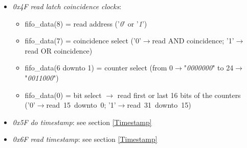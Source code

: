 \begin{itemize}
\begin{itemize}
	\end{itemize}
	\item \textit{0x4F} \textit{read latch coincidence clocks}:
	\begin{itemize}
		\item fifo\_data(8) = read address ('\textit{0}' or '\textit{1}')
		\item fifo\_data(7) = coincidence select ('0'$\rightarrow$read AND coincidence; '1'$\rightarrow$read OR coincidence)
		\item fifo\_data(6 downto 1) = counter select (from 0$\rightarrow$"\textit{0000000}" to 24$\rightarrow$"\textit{0011000}")
		\item fifo\_data(0) = bit select $\rightarrow$ read first or last 16 bits of the counters \\('0'$\rightarrow$read~15~downto~0; '1'$\rightarrow$read~31~downto~15)
	\end{itemize}
	\item \textit{0x5F} \textit{do timestamp}: see section \ref{Timestamp}
	\item \textit{0x6F} \textit{read timestamp}: see section \ref{Timestamp}
\end{itemize}


